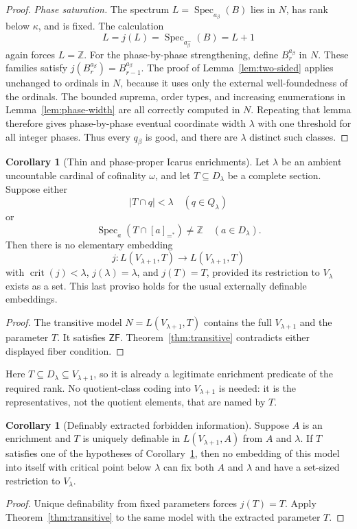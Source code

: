 \documentclass[11pt,letterpaper]{article}
\theoremstyle{definition}
\newtheorem{corollary}[definition]{Corollary}
\newcommand{\ZF}{\mathsf{ZF}}
\newcommand{\crit}{\operatorname{crit}}
\numberwithin{equation}{section}
\newcommand{\ZZ}{\mathbb Z}
\newcommand{\Spec}{\operatorname{Spec}}
\begin{document}
\begin{proof}
\emph{Phase saturation.} The spectrum $L=\Spec_{a_\beta}(B)$ lies in $N$, has rank below $\kappa$, and is fixed. The calculation
\[
L=j(L)=\Spec_{a_\beta^-}(B)=L+1
\]
again forces $L=\ZZ$. For the phase-by-phase strengthening, define $B_r^{a_\beta}$ in $N$. These families satisfy $j(B_r^{a_\beta})=B_{r-1}^{a_\beta}$. The proof of Lemma~\ref{lem:two-sided} applies unchanged to ordinals in $N$, because it uses only the external well-foundedness of the ordinals. The bounded suprema, order types, and increasing enumerations in Lemma~\ref{lem:phase-width} are all correctly computed in $N$. Repeating that lemma therefore gives phase-by-phase eventual coordinate width $\lambda$ with one threshold for all integer phases. Thus every $q_\beta$ is good, and there are $\lambda$ distinct such classes.
\end{proof}

\begin{corollary}[Thin and phase-proper Icarus enrichments]\label{cor:icarus}
Let $\lambda$ be an ambient uncountable cardinal of cofinality $\omega$, and let $T\subseteq D_\lambda$ be a complete section. Suppose either
\[
|T\cap q|<\lambda\quad(q\in Q_\lambda)
\]
or
\[
\Spec_a(T\cap[a]_{=^{*}})\ne\ZZ\quad(a\in D_\lambda).
\]
Then there is no elementary embedding
\[
j:L(V_{\lambda+1},T)\longrightarrow L(V_{\lambda+1},T)
\]
with $\crit(j)<\lambda$, $j(\lambda)=\lambda$, and $j(T)=T$, provided its restriction to $V_\lambda$ exists as a set. This last proviso holds for the usual externally definable embeddings.
\end{corollary}
\begin{proof}
The transitive model $N=L(V_{\lambda+1},T)$ contains the full $V_{\lambda+1}$ and the parameter $T$. It satisfies $\ZF$. Theorem~\ref{thm:transitive} contradicts either displayed fiber condition.
\end{proof}

Here $T\subseteq D_\lambda\subseteq V_{\lambda+1}$, so it is already a legitimate enrichment predicate of the required rank. No quotient-class coding into $V_{\lambda+1}$ is needed: it is the representatives, not the quotient elements, that are named by $T$.

\begin{corollary}[Definably extracted forbidden information]\label{cor:icarus-info}
Suppose $A$ is an enrichment and $T$ is uniquely definable in $L(V_{\lambda+1},A)$ from $A$ and $\lambda$. If $T$ satisfies one of the hypotheses of Corollary~\ref{cor:icarus}, then no embedding of this model into itself with critical point below $\lambda$ can fix both $A$ and $\lambda$ and have a set-sized restriction to $V_\lambda$.
\end{corollary}
\begin{proof}
Unique definability from fixed parameters forces $j(T)=T$. Apply Theorem~\ref{thm:transitive} to the same model with the extracted parameter $T$.
\end{proof}
\end{document}
